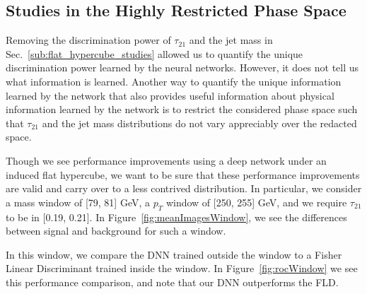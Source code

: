 \subsection{Studies in the Highly Restricted Phase Space} %
\label{sub:small_window_studies}

Removing the discrimination power of $\tau_{21}$ and the jet mass in Sec.~\ref{sub:flat_hypercube_studies} allowed us to quantify the unique discrimination power learned by the neural networks.  However, it does not tell us what information is learned.  Another way to quantify the unique information learned by the network that also provides useful information about physical information learned by the network is to restrict the considered phase space such that $\tau_{21}$ and the jet mass distributions do not vary appreciably over the redacted space.  

Though we see performance improvements using a deep network under an induced flat hypercube, we want to be sure that these performance improvements are valid and carry over to a less contrived distribution. In particular, we consider a mass window of [79, 81] GeV, a $p_T$ window of [250, 255] GeV, and we require $\tau_21$ to be in [0.19, 0.21]. In Figure~\ref{fig:meanImagesWindow}, we see the differences between signal and background for such a window.




In this window, we compare the DNN trained outside the window to a Fisher Linear Discriminant trained inside the window. In Figure~\ref{fig:rocWindow} we see this performance comparison, and note that our DNN outperforms the FLD.


